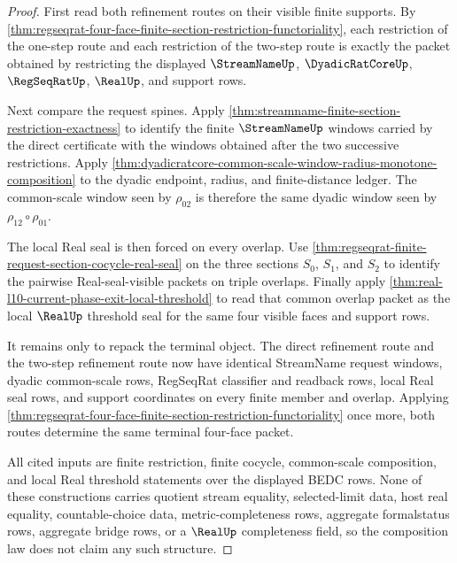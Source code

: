 \begin{proof}
First read both refinement routes on their visible finite supports. By
\autoref{thm:regseqrat-four-face-finite-section-restriction-functoriality},
each restriction of the one-step route and each restriction of the two-step
route is exactly the packet obtained by restricting the displayed
$\StreamNameUp$, $\DyadicRatCoreUp$, $\RegSeqRatUp$, $\RealUp$, and support
rows.

Next compare the request spines. Apply
\autoref{thm:streamname-finite-section-restriction-exactness} to identify
the finite $\StreamNameUp$ windows carried by the direct certificate with the
windows obtained after the two successive restrictions. Apply
\autoref{thm:dyadicratcore-common-scale-window-radius-monotone-composition}
to the dyadic endpoint, radius, and finite-distance ledger. The common-scale
window seen by $\rho_{02}$ is therefore the same dyadic window seen by
$\rho_{12}\circ\rho_{01}$.

The local Real seal is then forced on every overlap. Use
\autoref{thm:regseqrat-finite-request-section-cocycle-real-seal} on the
three sections $S_0$, $S_1$, and $S_2$ to identify the pairwise
Real-seal-visible packets on triple overlaps. Finally apply
\autoref{thm:real-l10-current-phase-exit-local-threshold} to read that
common overlap packet as the local $\RealUp$ threshold seal for the same
four visible faces and support rows.

It remains only to repack the terminal object. The direct refinement route
and the two-step refinement route now have identical StreamName request
windows, dyadic common-scale rows, RegSeqRat classifier and readback rows,
local Real seal rows, and support coordinates on every finite member and
overlap. Applying
\autoref{thm:regseqrat-four-face-finite-section-restriction-functoriality}
once more, both routes determine the same terminal four-face packet.

All cited inputs are finite restriction, finite cocycle, common-scale
composition, and local Real threshold statements over the displayed BEDC
rows. None of these constructions carries quotient stream equality,
selected-limit data, host real equality, countable-choice data,
metric-completeness rows, aggregate formalstatus rows, aggregate bridge rows,
or a $\RealUp$ completeness field, so the composition law does not claim
any such structure.
\end{proof}

